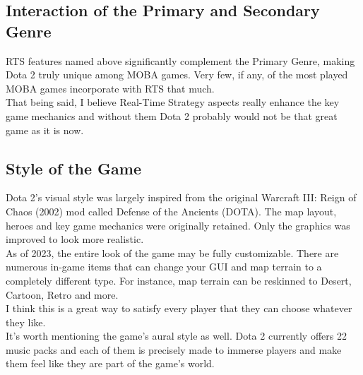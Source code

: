 \documentclass[a4paper,10pt,english]{article}
\begin{document}
\subsection*{Interaction of the Primary and Secondary Genre}

RTS features named above significantly complement the Primary Genre, making Dota 2 truly unique among MOBA games. Very few, if any, of the most played MOBA games incorporate with RTS that much. \\
That being said, I believe Real-Time Strategy aspects really enhance the key game mechanics and without them Dota 2 probably would not be that great game as it is now.

\subsection*{Style of the Game}

Dota 2's visual style was largely inspired from the original Warcraft III: Reign of Chaos (2002) mod called Defense of the Ancients (DOTA). The map layout, heroes and key game mechanics were originally retained. Only the graphics was improved to look more realistic. \\
As of 2023, the entire look of the game may be fully customizable. There are numerous in-game items that can change your GUI and map terrain to a completely different type. For instance, map terrain can be reskinned to Desert, Cartoon, Retro and more. \\
I think this is a great way to satisfy every player that they can choose whatever they like. \\ 
It's worth mentioning the game's aural style as well. Dota 2 currently offers 22 music packs and each of them is precisely made to immerse players and make them feel like they are part of the game's world.
\end{document}
